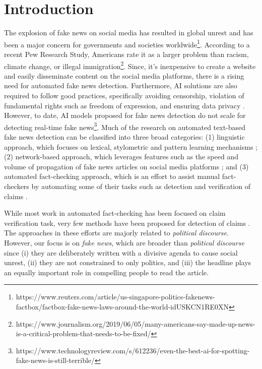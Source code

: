 \documentclass[11pt,a4paper]{article}
\begin{document}
\section{Introduction}
\label{sec:intro}
{
The explosion of fake news on social media has resulted in global unrest and has been a major concern for governments and societies worldwide\footnote{https://www.reuters.com/article/us-singapore-politics-fakenews-factbox/factbox-fake-news-laws-around-the-world-idUSKCN1RE0XN}. According to a recent Pew Research Study, Americans rate it as a larger problem than racism, climate change, or illegal immigration\footnote{https://www.journalism.org/2019/06/05/many-americans-say-made-up-news-is-a-critical-problem-that-needs-to-be-fixed/}. Since, it's inexpensive to create a website and easily disseminate content on the social media platforms, there is a rising need for automated fake news detection. Furthermore, AI solutions are also required to follow good practices, specifically avoiding censorship, violation of fundamental rights such as freedom of expression, and ensuring data privacy \cite{de2018multi}. However, to date, AI models proposed for fake news detection do not scale for detecting real-time fake news\footnote{https://www.technologyreview.com/s/612236/even-the-best-ai-for-spotting-fake-news-is-still-terrible/}. 
} \newline
{
\indent Much of the research on automated text-based fake news detection can be classified into three broad categories: (1) linguistic approach, which focuses on lexical, stylometric and pattern learning mechanisms \cite{potthast2017stylometric,rashkin2017truth, wang2017liar,singhania20173han,perez-rosas-etal-2018-automatic}; (2) network-based approach, which leverages features such as the speed and volume of propagation of fake news articles on social media platforms \cite{castillo2011information,yang2012automatic,kwon2013prominent,Ma:2015:DRU:2806416.2806607,jin2016news,Ruchansky:2017:CHD:3132847.3132877, Wu:2018:TFF:3159652.3159677}; and (3) automated fact-checking approach, which is an effort to assist manual fact-checkers by automating some of their tasks such as detection and verification of claims \cite{graves2018understanding}.
}

{
\indent While most work in automated fact-checking has been focused on claim verification task, very few methods have been proposed for detection of claims \cite{hassan2017toward,jaradat-etal-2018-claimrank, konstantinovskiy2018towards}. The approaches in these efforts are majorly related to \textit{political discourse}. However, our focus is on \textit{fake news}, which are broader than \textit{political discourse} since (i) they are deliberately written with a divisive agenda to cause social unrest, (ii) they are not constrained to only politics, and (iii) the headline plays an equally important role in compelling people to read the article. 
}
\end{document}
